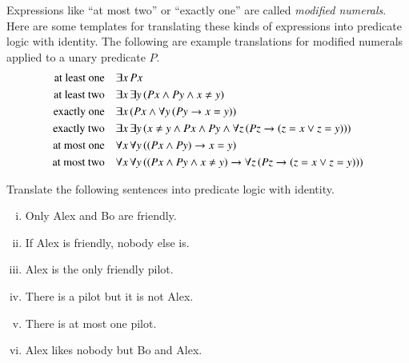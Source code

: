 \documentclass[nobib,nofonts]{tufte-handout}
\begin{document}
Expressions like ``at most two'' or ``exactly one'' are called \emph{modified numerals}.
Here are some templates for translating these kinds of expressions into predicate logic with identity.
The following are example translations for modified numerals applied to a unary predicate $P$.
\begin{align*}
  \text{at least one} &&& \exists x \thinspace Px \\
  \text{at least two} &&& \exists x \thinspace  \exists y \thinspace (Px \wedge Py \wedge x \neq y) \\
  \text{exactly one}  &&& \exists x \thinspace (Px \wedge \forall y \thinspace (Py \rightarrow x = y) )\\
  \text{exactly two}  &&& \exists x \thinspace \exists y \thinspace (x \neq y \wedge Px \wedge Py \wedge \forall z \thinspace (Pz \rightarrow (z = x \vee z = y))) \\
  \text{at most one}  &&& \forall x \thinspace \forall y \thinspace ((Px \wedge Py) \rightarrow x = y) \\
  \text{at most two}  &&& \forall x \thinspace \forall y \thinspace ((Px \wedge Py \wedge x \neq y) \rightarrow \forall z \thinspace (Pz \rightarrow (z =x \vee z = y)) )
\end{align*}


\bigskip
\noindent \colorbox{mygray}{\centering
  \begin{minipage}{1.0\textwidth}

    \begin{exercise}
      Translate the following sentences into predicate logic with identity.
      \begin{enumerate}[(i)]
        \item Only Alex and Bo are friendly.
        \item If Alex is friendly, nobody else is.
        \item Alex is the only friendly pilot.
        \item There is a pilot but it is not Alex.
        \item There is at most one pilot.
        \item Alex likes nobody but Bo and Alex.
      \end{enumerate}
    \end{exercise}

  \end{minipage}
}
\end{document}
